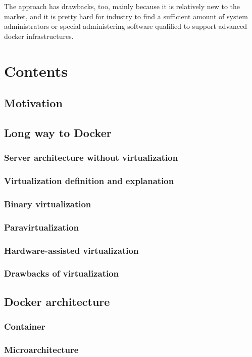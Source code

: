 The approach has drawbacks, too, mainly
because it is relatively new to the market,
and it is pretty hard for industry to find
a sufficient amount of system administrators or special
administering software qualified to support advanced docker infrastructures.

\appendix
\section{Contents}
\subsection{Motivation}
\subsection{Long way to Docker}
\subsubsection{Server architecture without virtualization}
\subsubsection{Virtualization definition and explanation}
\subsubsection{Binary virtualization}
\subsubsection{Paravirtualization}
\subsubsection{Hardware-assisted virtualization}
\subsubsection{Drawbacks of virtualization}
\subsection{Docker architecture}
\subsubsection{Container}
\subsubsection{Microarchitecture}
